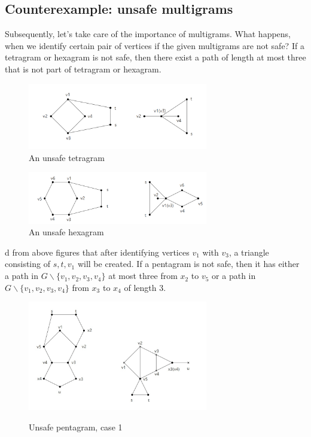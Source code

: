 \subsection{Counterexample: unsafe multigrams}
Subsequently, let's take care of the importance of multigrams. What happens, when we identify certain pair of vertices if the given multigrams are not safe? If a tetragram or hexagram is not safe, then there exist a path of length at most three that is not part of tetragram or hexagram.
\begin{figure}[H] %
\centering %
\includegraphics[width=0.7\textwidth]{figure/unsafetetragram.png} 
\caption{An unsafe tetragram} %
\label{figure} %
\end{figure}

\begin{figure}[H] %
\centering %
\includegraphics[width=0.7\textwidth]{figure/unsafehexagram.png} 
\caption{An unsafe hexagram} %
\label{figure} %
\end{figure}
d from above figures that after identifying vertices $v_1$ with $v_3$, a triangle consisting of $s, t, v_1$ will be created.
If a pentagram is not safe, then it has either a path in $G \backslash \{v_1, v_2, v_3, v_4\}$ at most three from $x_2$ to $v_5$ or a path in $G \backslash \{v_1, v_2, v_3, v_4\}$ from $x_3$ to $x_4$ of length 3.
\begin{figure}[H] %
\centering %
\includegraphics[width=0.7\textwidth]{figure/Inkedunsafepentagram1_LI.jpg} 
\label{figure} %
\caption{Unsafe pentagram, case 1}
\end{figure}

